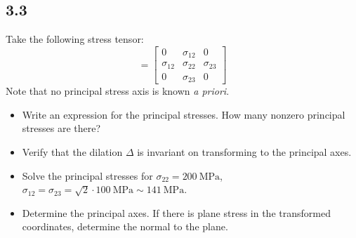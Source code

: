\documentclass[12pt]{article}
\begin{document}
\subsection{3.3}
Take the following stress tensor:
\begin{equation}
    [\sigma] = \begin{bmatrix}
        0           & \sigma_{12} & 0           \\
        \sigma_{12} & \sigma_{22} & \sigma_{23} \\
        0           & \sigma_{23} & 0
    \end{bmatrix}
\end{equation}
Note that no principal stress axis is known \textit{a priori}.
\begin{itemize}
    \item Write an expression for the principal stresses. How many nonzero principal stresses are there?
    \item Verify that the dilation $\Delta$ is invariant on transforming to the principal axes.
    \item Solve the principal stresses for $\sigma_{22} = \SI{200}{\mega\pascal}$,
          $\sigma_{12} = \sigma_{23} = \sqrt{2} \cdot \SI{100}{\mega\pascal} \sim \SI{141}{\mega\pascal}$.
    \item Determine the principal axes. If there is plane stress in the transformed coordinates, determine the normal to the plane.
\end{itemize}

\end{document}
